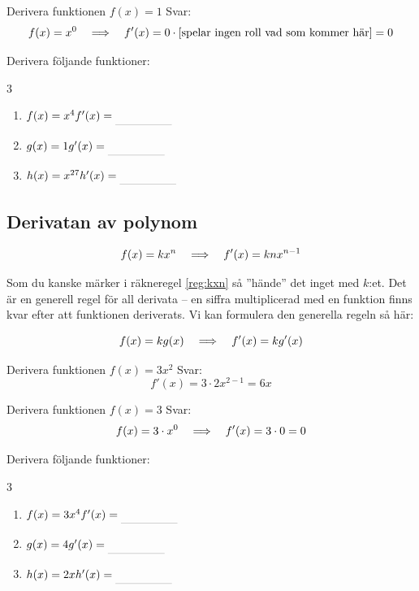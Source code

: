 \documentclass[a4paper, 12pt]{article}
\begin{document}
\begin{exempel}
    Derivera funktionen $f(x) = 1$
    \dinkus
    Svar: \[f(x) = x^0 \hspace{1em} \Longrightarrow \hspace{1em} f'(x) = 0 \cdot \left[ \text{spelar ingen roll vad som kommer här}\right] = 0\]
\end{exempel}

\begin{uppgifter}
    \label{upp:x^n}
    Derivera följande funktioner:
    \begin{multicols}{3}
        \begin{enumerate}
            \item $f(x) = x^4 \\ f'(x) \ans$
            \item $g(x) = 1 \\ g'(x) \ans$
            \item $h(x) = x^{27} \\ h'(x) \ans$
        \end{enumerate}
    \end{multicols}
\end{uppgifter}

\subsection{Derivatan av polynom}

\begin{regel}
    \label{reg:kxn}
    \[f(x) = kx^n \hspace{1em} \Longrightarrow \hspace{1em} f'(x) = knx^{n-1}\]
\end{regel}
Som du kanske märker i räkneregel \ref*{reg:kxn} så ''hände'' det inget med $k$:et. Det är en generell regel för all derivata -- en siffra multiplicerad med en funktion finns kvar efter att funktionen deriverats. Vi kan formulera den generella regeln så här:

\begin{regel}
    \label{reg:kf(x)}
    \[ f(x) = k g(x) \hspace{1em} \Longrightarrow \hspace{1em} f'(x) = k g'(x) \]
\end{regel}

\begin{exempel}
    Derivera funktionen $f(x) = 3x^2$ \dinkus Svar: \[f'(x) = 3\cdot 2x^{2-1} = 6x\]
\end{exempel}

\begin{exempel}
    Derivera funktionen $f(x) = 3$ \dinkus Svar: \[f(x) = 3 \cdot x^0 \hspace{1em} \Longrightarrow \hspace{1em} f'(x) = 3 \cdot 0 = 0\]
\end{exempel}

\begin{uppgifter}
    \label{upp:kx^n}
    Derivera följande funktioner:
    \begin{multicols}{3}
        \begin{enumerate}
            \item $f(x) = 3x^4 \\ f'(x) \ans$
            \item $g(x) = 4 \\ g'(x) \ans$
            \item $h(x) = 2x \\ h'(x) \ans$
        \end{enumerate}
    \end{multicols}
\end{uppgifter}
\end{document}
